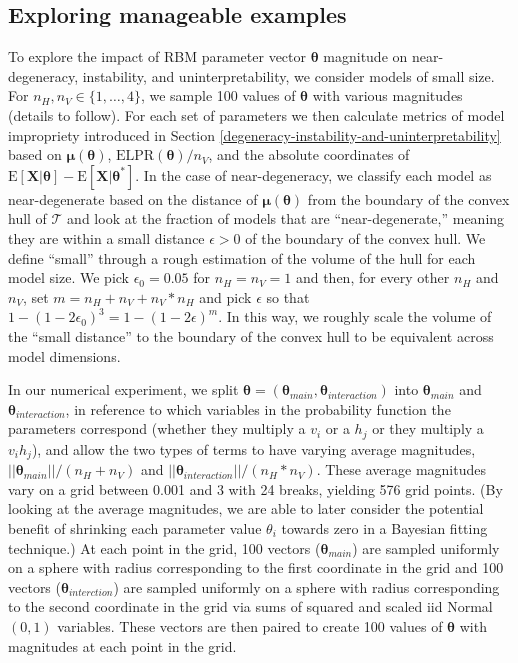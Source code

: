 \documentclass[12pt]{article}
\theoremstyle{definition}
\newcommand{\nv}{{n_{\scriptscriptstyle V}}}
\newcommand{\nh}{{n_{\scriptscriptstyle H}}}
\begin{document}
\subsection{Exploring manageable
examples}\label{exploring-manageable-examples}

To explore the impact of RBM parameter vector \(\boldsymbol \theta\)
magnitude on near-degeneracy, instability, and uninterpretability, we
consider models of small size. For \(\nh, \nv \in \{1, \dots, 4\}\), we
sample 100 values of \(\boldsymbol \theta\) with various magnitudes
(details to follow). For each set of parameters we then calculate
metrics of model impropriety introduced in Section
\ref{degeneracy-instability-and-uninterpretability} based on
\(\boldsymbol \mu(\boldsymbol \theta)\),
\(\text{ELPR}(\boldsymbol \theta)/\nv\), and the absolute coordinates of
\(\text{E}\left[\boldsymbol X | \boldsymbol \theta\right] - \text{E}\left[\boldsymbol X | \boldsymbol \theta^* \right]\).
In the case of near-degeneracy, we classify each model as
near-degenerate based on the distance of
\(\boldsymbol \mu(\boldsymbol \theta)\) from the boundary of the convex
hull of \(\mathcal{T}\) and look at the fraction of models that are
``near-degenerate,'' meaning they are within a small distance
\(\epsilon > 0\) of the boundary of the convex hull. We define ``small''
through a rough estimation of the volume of the hull for each model
size. We pick \(\epsilon_0 = 0.05\) for \(\nh=\nv=1\) and then, for
every other \(\nh\) and \(\nv\), set \(m=\nh+\nv+\nv*\nh\) and pick
\(\epsilon\) so that \(1-(1-2\epsilon_0)^3 = 1 - (1-2\epsilon)^m\). In
this way, we roughly scale the volume of the ``small distance'' to the
boundary of the convex hull to be equivalent across model dimensions.

In our numerical experiment, we split
\(\boldsymbol \theta = (\boldsymbol \theta_{main}, \boldsymbol \theta_{interaction})\)
into \(\boldsymbol \theta_{main}\) and
\(\boldsymbol \theta_{interaction}\), in reference to which variables in
the probability function the parameters correspond (whether they
multiply a \(v_i\) or a \(h_j\) or they multiply a \(v_i h_j\)), and
allow the two types of terms to have varying average magnitudes,
\(||\boldsymbol \theta_{main} || /(\nh+\nv)\) and
\(||\boldsymbol \theta_{interaction} || /(\nh*\nv)\). These average
magnitudes vary on a grid between 0.001 and 3 with 24 breaks, yielding
576 grid points. (By looking at the average magnitudes, we are able to
later consider the potential benefit of shrinking each parameter value
\(\theta_i\) towards zero in a Bayesian fitting technique.) At each
point in the grid, 100 vectors (\(\boldsymbol \theta_{main}\)) are
sampled uniformly on a sphere with radius corresponding to the first
coordinate in the grid and 100 vectors
(\(\boldsymbol \theta_{interction}\)) are sampled uniformly on a sphere
with radius corresponding to the second coordinate in the grid via sums
of squared and scaled iid Normal\((0, 1)\) variables. These vectors are
then paired to create 100 values of \(\boldsymbol \theta\) with
magnitudes at each point in the grid.
\end{document}
